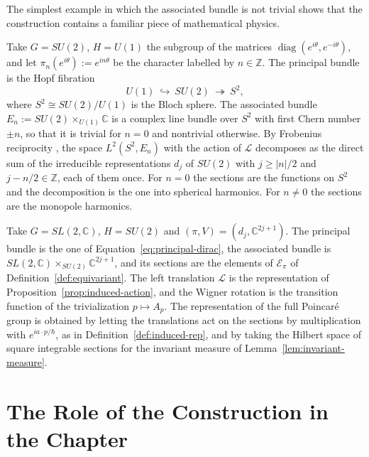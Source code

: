	The simplest example in which the associated bundle is not trivial shows that the construction contains a familiar piece of mathematical physics.
	
	\begin{example}\label{ex:spherical-harmonics}
		Take $G=SU(2)$, $H=U(1)$ the subgroup of the matrices $\operatorname{diag}(e^{i\theta},e^{-i\theta})$, and let $\pi_n(e^{i\theta}):=e^{in\theta}$ be the character labelled by $n\in\mathbb{Z}$. The principal bundle is the Hopf fibration
		\begin{equation*}
			U(1)\ \hookrightarrow\ SU(2)\ \twoheadrightarrow\ S^2,
		\end{equation*}
		where $S^2\cong SU(2)/U(1)$ is the Bloch sphere. The associated bundle $E_n:=SU(2)\times_{U(1)}\mathbb{C}$ is a complex line bundle over $S^2$ with first Chern number $\pm n$, so that it is trivial for $n=0$ and nontrivial otherwise. By Frobenius reciprocity \cite[TODO-location]{TODO-BarutRaczka}, the space $L^2(S^2,E_n)$ with the action of $\mathcal{L}$ decomposes as the direct sum of the irreducible representations $d_j$ of $SU(2)$ with $j\geq|n|/2$ and $j-n/2\in\mathbb{Z}$, each of them once. For $n=0$ the sections are the functions on $S^2$ and the decomposition is the one into spherical harmonics. For $n\neq0$ the sections are the monopole harmonics.
	\end{example}
	
	\begin{example}\label{ex:dirac-induced}
		Take $G=SL(2,\mathbb{C})$, $H=SU(2)$ and $(\pi,V)=(d_j,\mathbb{C}^{2j+1})$. The principal bundle is the one of Equation~\eqref{eq:principal-dirac}, the associated bundle is $SL(2,\mathbb{C})\times_{SU(2)}\mathbb{C}^{2j+1}$, and its sections are the elements of $\mathcal{E}_\pi$ of Definition~\ref{def:equivariant}. The left translation $\mathcal{L}$ is the representation of Proposition~\ref{prop:induced-action}, and the Wigner rotation is the transition function of the trivialization $p\mapsto A_p$. The representation of the full Poincar\'e group is obtained by letting the translations act on the sections by multiplication with $e^{ia\cdot p/\hbar}$, as in Definition~\ref{def:induced-rep}, and by taking the Hilbert space of square integrable sections for the invariant measure of Lemma~\ref{lem:invariant-measure}.
	\end{example}
	
	\section{The Role of the Construction in the Chapter}
	\label{sec:induced-necessity}
	
